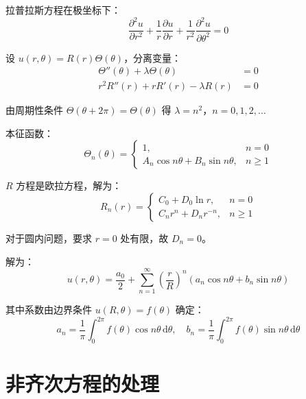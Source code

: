 拉普拉斯方程在极坐标下：
\begin{equation}
    \frac{\partial^2 u}{\partial r^2} + \frac{1}{r}\frac{\partial u}{\partial r} + \frac{1}{r^2}\frac{\partial^2 u}{\partial \theta^2} = 0
\end{equation}

设 $u(r, \theta) = R(r)\Theta(\theta)$，分离变量：
\begin{align}
    \Theta''(\theta) + \lambda\Theta(\theta) &= 0 \\
    r^2R''(r) + rR'(r) - \lambda R(r) &= 0
\end{align}

由周期性条件 $\Theta(\theta + 2\pi) = \Theta(\theta)$ 得 $\lambda = n^2$，$n = 0, 1, 2, \ldots$

本征函数：
\begin{equation}
    \Theta_n(\theta) = \begin{cases}
        1, & n = 0 \\
        A_n\cos n\theta + B_n\sin n\theta, & n \geq 1
    \end{cases}
\end{equation}

$R$ 方程是欧拉方程，解为：
\begin{equation}
    R_n(r) = \begin{cases}
        C_0 + D_0\ln r, & n = 0 \\
        C_n r^n + D_n r^{-n}, & n \geq 1
    \end{cases}
\end{equation}

对于圆内问题，要求 $r = 0$ 处有限，故 $D_n = 0$。

解为：
\begin{equation}
    u(r, \theta) = \frac{a_0}{2} + \sum_{n=1}^{\infty}\left(\frac{r}{R}\right)^n\left(a_n\cos n\theta + b_n\sin n\theta\right)
\end{equation}

其中系数由边界条件 $u(R, \theta) = f(\theta)$ 确定：
\begin{equation}
    a_n = \frac{1}{\pi}\int_0^{2\pi} f(\theta)\cos n\theta\,\mathrm{d}\theta, \quad b_n = \frac{1}{\pi}\int_0^{2\pi} f(\theta)\sin n\theta\,\mathrm{d}\theta
\end{equation}

\section{非齐次方程的处理}

